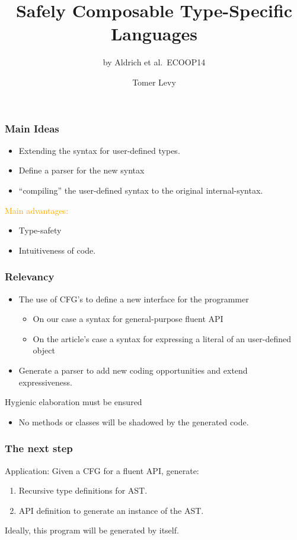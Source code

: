 \documentclass{beamer}
\author{Tomer Levy}
\title{Safely Composable Type-Specific Languages}
\subtitle{by Aldrich et al.~ECOOP14}
\begin{document}
\begin{frame}
\maketitle
\end{frame}
\begin{frame}
\frametitle{Main Ideas}
\begin{itemize}
\item Extending the syntax for user-defined types.
\item Define a parser for the new syntax
\item ``compiling'' the user-defined syntax to the original internal-syntax.
\end{itemize}
\textcolor{orange}{Main advantages:}
\begin{itemize}
\item Type-safety 
\item Intuitiveness of code.
\end{itemize}
\end{frame}

\begin{frame}
\frametitle{Relevancy}
\begin{itemize}
\item The use of CFG's to define a new interface for the programmer 
	\begin{itemize}
	\item On our case a syntax for general-purpose fluent API
	\item On the article's case a syntax for expressing a literal of an user-defined object
	\end{itemize}
\item Generate a parser to add new coding opportunities and extend expressiveness.
\end{itemize}
\alert{Hygienic elaboration must be ensured}
\begin{itemize}
\item No methods or classes will be shadowed by the generated code.
\end{itemize}
\end{frame}

\begin{frame}
\frametitle{The next step}
\alert{Application: }
 Given a CFG for a fluent API, generate:
	\begin{enumerate}
	\item Recursive type definitions for AST.
	\item API definition to generate an instance of the AST.	
	 \end{enumerate}

Ideally, this program will be generated by itself.
\end{frame}
\end{document}
